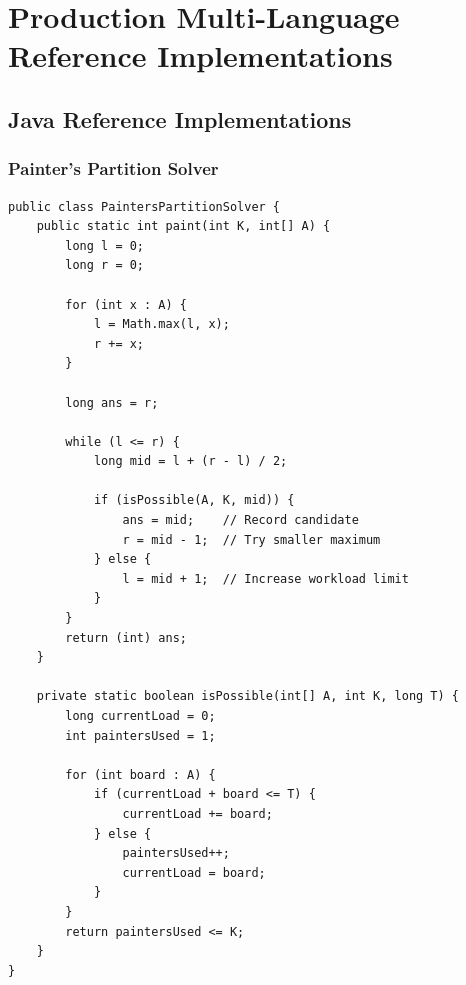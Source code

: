 \documentclass[10pt,journal,compsoc,onecolumn]{IEEEtran}
\begin{document}
\section{Production Multi-Language Reference Implementations}
\label{sec:implementations}

\subsection{Java Reference Implementations}

\subsubsection{Painter's Partition Solver}
{\footnotesize
\begin{verbatim}
public class PaintersPartitionSolver {
    public static int paint(int K, int[] A) {
        long l = 0;
        long r = 0;

        for (int x : A) {
            l = Math.max(l, x);
            r += x;
        }

        long ans = r;

        while (l <= r) {
            long mid = l + (r - l) / 2;

            if (isPossible(A, K, mid)) {
                ans = mid;    // Record candidate
                r = mid - 1;  // Try smaller maximum
            } else {
                l = mid + 1;  // Increase workload limit
            }
        }
        return (int) ans;
    }

    private static boolean isPossible(int[] A, int K, long T) {
        long currentLoad = 0;
        int paintersUsed = 1;

        for (int board : A) {
            if (currentLoad + board <= T) {
                currentLoad += board;
            } else {
                paintersUsed++;
                currentLoad = board;
            }
        }
        return paintersUsed <= K;
    }
}
\end{verbatim}
}
\end{document}

